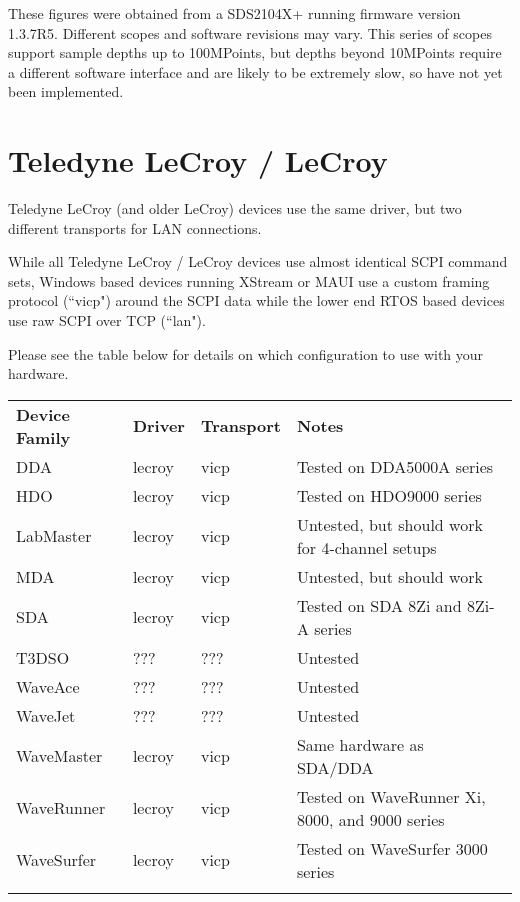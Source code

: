 These figures were obtained from a SDS2104X+ running firmware version 1.3.7R5. Different scopes and software
revisions may vary. This series of scopes support sample depths up to 100MPoints, but depths beyond 10MPoints
require a different software interface and are likely to be extremely slow, so have not yet been implemented.

\section{Teledyne LeCroy / LeCroy}

Teledyne LeCroy (and older LeCroy) devices use the same driver, but two different transports for LAN connections.

While all Teledyne LeCroy / LeCroy devices use almost identical SCPI command sets, Windows based devices running
XStream or MAUI use a custom framing protocol (``vicp") around the SCPI data while the lower end RTOS based devices use
raw SCPI over TCP (``lan").

Please see the table below for details on which configuration to use with  your hardware.

\begin{tabularx}{16cm}{lllX}
\thickhline
\textbf{Device Family} & \textbf{Driver} & \textbf{Transport} & \textbf{Notes} \\
\thickhline
DDA & lecroy & vicp & Tested on DDA5000A series \\
\thinhline
HDO & lecroy & vicp & Tested on HDO9000 series \\
\thinhline
LabMaster & lecroy & vicp & Untested, but should work for 4-channel setups\\
\thinhline
MDA & lecroy & vicp & Untested, but should work\\
\thinhline
SDA & lecroy & vicp & Tested on SDA 8Zi and 8Zi-A series\\
\thinhline
T3DSO & ??? & ??? & Untested\\
\thinhline
WaveAce & ??? & ??? & Untested\\
\thinhline
WaveJet & ??? & ??? & Untested\\
\thinhline
WaveMaster & lecroy & vicp & Same hardware as SDA/DDA\\
\thinhline
WaveRunner & lecroy & vicp & Tested on WaveRunner Xi, 8000, and 9000 series\\
\thinhline
WaveSurfer & lecroy & vicp & Tested on WaveSurfer 3000 series \\
\thickhline
\end{tabularx}

